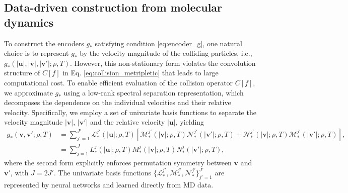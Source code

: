 \documentclass[preprint,1p,times]{elsarticle}
\theoremstyle{definition}
\theoremstyle{remark}
\begin{document}
\subsection{Data-driven construction from molecular dynamics}
To construct the encoders $g_\ast$ satisfying condition \eqref{eq:encoder_g}, one natural choice is to represent $g_\ast$ by the velocity magnitude of the colliding particles, i.e., $g_{\ast}(\vert \bm u\vert, \vert \bm v\vert, \vert \bm v'\vert; \rho, T)$. However, this non-stationary form violates the convolution structure of $C[f]$ in Eq. \eqref{eq:collision_metripletic} that leads to large computational cost. To enable efficient evaluation of the collision operator $C[f]$, we approximate $g_{\ast}$ using a low-rank spectral separation representation, which decomposes the dependence on the individual velocities and their relative velocity.
Specifically, we employ a set of univariate basis functions to separate the velocity magnitude $|\bm{v}|$, $|\bm{v}'|$ and the relative velocity $|\bm{u}|$, yielding
\begin{equation}\label{eq:SS}
    \begin{aligned}
        g_{\ast}(\bm{v}, \bm{v}'; \rho, T) &= \sum_{j'=1}^{J'} \mathcal{L}_{\ast}^{j'}(|\bm{u}|; \rho, T) 
        \left[ \mathcal{M}_{\ast}^{j'}(|\bm{v}|; \rho, T) \mathcal{N}_{\ast}^{j'}(|\bm{v}'|; \rho, T) + \mathcal{N}_{\ast}^{j'}(|\bm{v}|; \rho, T) \mathcal{M}_{\ast}^{j'}(|\bm{v}'|; \rho, T) \right] , \\
        &= \sum_{j=1}^{J} L_{\ast}^{j}(|\bm{u}|; \rho, T) M_{\ast}^{j}(|\bm{v}|; \rho, T) N_{\ast}^{j}(|\bm{v}'|; \rho, T),
    \end{aligned}
\end{equation}
where the second form explicitly enforces permutation symmetry between $\bm{v}$ and $\bm{v}'$, with $J = 2J'$.
The univariate basis functions $\{\mathcal{L}_{\ast}^{j'}, \mathcal{M}_{\ast}^{j'}, \mathcal{N}_{\ast}^{j'}\}_{j'=1}^{J'}$ are represented by neural networks and learned directly from MD data.
\end{document}
